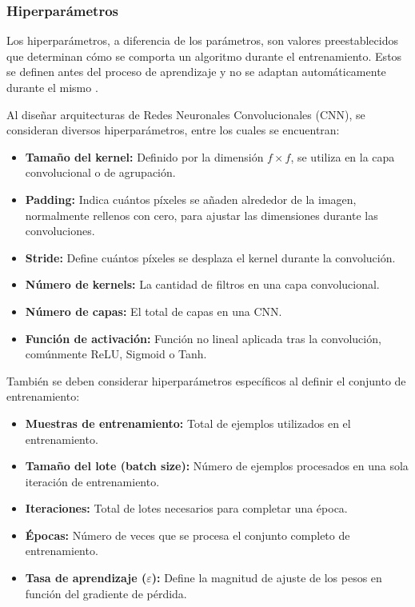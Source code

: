             \subsubsection{Hiperparámetros}
                Los hiperparámetros, a diferencia de los parámetros, son valores preestablecidos que determinan cómo se comporta un algoritmo durante el entrenamiento. Estos se definen antes del proceso de aprendizaje y no se adaptan automáticamente durante el mismo \autocite{Goodfellow2016}.
                
                Al diseñar arquitecturas de Redes Neuronales Convolucionales (CNN), se consideran diversos hiperparámetros, entre los cuales se encuentran:
                
                \begin{itemize}
                    \item[-] \textbf{Tamaño del kernel:} Definido por la dimensión \( f \times f \), se utiliza en la capa convolucional o de agrupación.
                    \item[-] \textbf{Padding:} Indica cuántos píxeles se añaden alrededor de la imagen, normalmente rellenos con cero, para ajustar las dimensiones durante las convoluciones.
                    \item[-] \textbf{Stride:} Define cuántos píxeles se desplaza el kernel durante la convolución.
                    \item[-] \textbf{Número de kernels:} La cantidad de filtros en una capa convolucional.
                    \item[-] \textbf{Número de capas:} El total de capas en una CNN.
                    \item[-] \textbf{Función de activación:} Función no lineal aplicada tras la convolución, comúnmente ReLU, Sigmoid o Tanh.
                \end{itemize}
                
                También se deben considerar hiperparámetros específicos al definir el conjunto de entrenamiento:
                
                \begin{itemize}
                    \item[-] \textbf{Muestras de entrenamiento:} Total de ejemplos utilizados en el entrenamiento.
                    \item[-] \textbf{Tamaño del lote (batch size):} Número de ejemplos procesados en una sola iteración de entrenamiento.
                    \item[-] \textbf{Iteraciones:} Total de lotes necesarios para completar una época.
                    \item[-] \textbf{Épocas:} Número de veces que se procesa el conjunto completo de entrenamiento.
                    \item[-] \textbf{Tasa de aprendizaje (\( \varepsilon \)):} Define la magnitud de ajuste de los pesos en función del gradiente de pérdida.
                \end{itemize}
                
